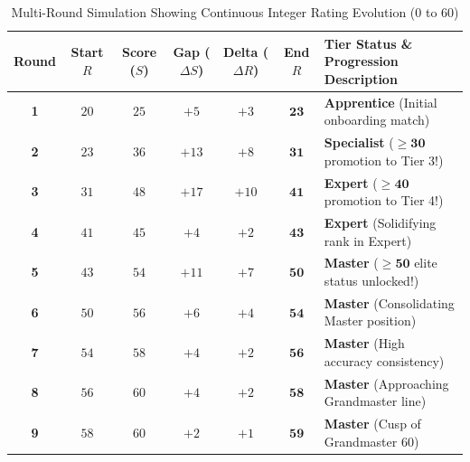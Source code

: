 \begin{table}[htbp]
\centering
\scriptsize
\begin{tabular}{|c|c|c|c|c|c|p{5.4cm}|}
\hline
\rowcolor{primaryBlue!15}
\textbf{Round} & \textbf{Start $R$} & \textbf{Score ($S$)} & \textbf{Gap ($\Delta S$)} & \textbf{Delta ($\Delta R$)} & \textbf{End $R$} & \textbf{Tier Status \& Progression Description} \\ \hline
\textbf{1} & $20$ & $25$ & $+5$ & $+3$ & $\mathbf{23}$ & \textbf{Apprentice} (Initial onboarding match) \\ \hline
\textbf{2} & $23$ & $36$ & $+13$ & $+8$ & $\mathbf{31}$ & \textbf{Specialist} ($\mathbf{\ge 30}$ promotion to Tier 3!) \\ \hline
\textbf{3} & $31$ & $48$ & $+17$ & $+10$ & $\mathbf{41}$ & \textbf{Expert} ($\mathbf{\ge 40}$ promotion to Tier 4!) \\ \hline
\textbf{4} & $41$ & $45$ & $+4$ & $+2$ & $\mathbf{43}$ & \textbf{Expert} (Solidifying rank in Expert) \\ \hline
\textbf{5} & $43$ & $54$ & $+11$ & $+7$ & $\mathbf{50}$ & \textbf{Master} ($\mathbf{\ge 50}$ elite status unlocked!) \\ \hline
\textbf{6} & $50$ & $56$ & $+6$ & $+4$ & $\mathbf{54}$ & \textbf{Master} (Consolidating Master position) \\ \hline
\textbf{7} & $54$ & $58$ & $+4$ & $+2$ & $\mathbf{56}$ & \textbf{Master} (High accuracy consistency) \\ \hline
\textbf{8} & $56$ & $60$ & $+4$ & $+2$ & $\mathbf{58}$ & \textbf{Master} (Approaching Grandmaster line) \\ \hline
\textbf{9} & $58$ & $60$ & $+2$ & $+1$ & $\mathbf{59}$ & \textbf{Master} (Cusp of Grandmaster 60) \\ \hline
\end{tabular}
\caption{Multi-Round Simulation Showing Continuous Integer Rating Evolution ($0$ to $60$)}
\end{table}

